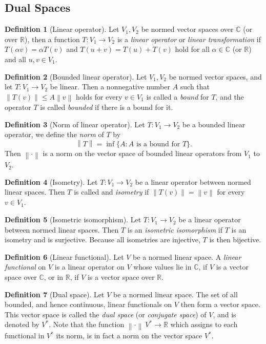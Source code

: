 \documentclass[12pt]{article}
\theoremstyle{definition}
\newtheorem{definition}{Definition}[section]
\newcommand{\real}{\mathbb{R}}   %
\newcommand{\C}{\mathbb{C}}    %
\newcommand\norm[1]{\left\lVert#1\right\rVert}
\begin{document}
\subsection{Dual Spaces}
\begin{definition}[Linear operator]
    Let $V_1,V_2$ be normed vector spaces over $\C$ (or over $\real$), then a function $T:V_1\to V_2$ is a \textit{linear operator} or \textit{linear transformation} if $T(\alpha v)=\alpha T(v)$ and $T(u+v)=T(u)+T(v)$ hold for all $\alpha\in\C$ (or $\real$) and all $u,v\in V_1$.
\end{definition}
\begin{definition}[Bounded linear operator]
    Let $V_1,V_2$ be normed vector spaces, and let $T:V_1 \to V_2$ be linear. Then a nonnegative number $A$ such that $\norm{T(v)}\leq A\norm{v}$ holds for every $v\in V_1$ is called a \textit{bound} for $T$, and the operator $T$ is called \textit{bounded} if there is a bound for it.
\end{definition}
\begin{definition}[Norm of linear operator]
    Let $T:V_1\to V_2$ be a bounded linear operator, we define the \textit{norm} of $T$ by
    \begin{equation*}
        \norm{T}=\inf\{A: A\text{ is a bound for }T\}.
    \end{equation*}
    Then $\norm{\cdot}$ is a norm on the vector space of bounded linear operators from $V_1$ to $V_2$.
\end{definition}
\begin{definition}[Isometry]
    Let $T:V_1\to V_2$ be a linear operator between normed linear spaces. Then $T$ is called and \textit{isometry} if $\norm{T(v)}=\norm{v}$ for every $v\in V_1$.
\end{definition}
\begin{definition}[Isometric isomorphism]
    Let $T:V_1\to V_2$ be a linear operator between normed linear spaces. Then $T$ is an \textit{isometric isomorphism} if $T$ is an isometry and is surjective. Because all isometries are injective, $T$ is then bijective.
\end{definition}
\begin{definition}[Linear functional]
    Let $V$ be a normed linear space. A \textit{linear functional} on $V$ is a linear operator on $V$ whose values lie in $\C$, if $V$ is a vector space over $\C$, or in $\real$, if $V$ is a vector space over $\real$.
\end{definition}
\begin{definition}[Dual space]
    Let $V$ be a normed linear space. The set of all bounded, and hence continuous, linear functionals on $V$ then form a vector space. This vector space is called the \textit{dual space} (or \textit{conjugate space}) of $V$, and is denoted by $V^*$. Note that the function $\norm{\cdot}\:V^*\to \real$ which assigns to each functional in $V^*$ its norm, is in fact a norm on the vector space $V^*$.
\end{definition}
\newpage
\end{document}
